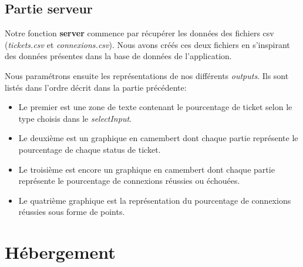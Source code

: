 \documentclass[12pt, a4paper]{article}
\begin{document}
\subsection*{Partie serveur}

Notre fonction \textbf{server} commence par récupérer les données des fichiers csv (\textit{tickets.csv} et \textit{connexions.csv}).
Nous avons créés ces deux fichiers en s'inspirant des données présentes dans la base de données de l'application.

\noindent Nous paramétrons ensuite les représentations de nos différents \textit{outputs}.
Ils sont listés dans l'ordre décrit dans la partie précédente:

\begin{itemize}
    \item Le premier est une zone de texte contenant le pourcentage de ticket selon le type choisis dans le \textit{selectInput}.
    \item Le deuxième est un graphique en camembert dont chaque partie représente le pourcentage de chaque status de ticket.
    \item Le troisième est encore un graphique en camembert dont chaque partie représente le pourcentage de connexions réussies ou échouées.
    \item Le quatrième graphique est la représentation du pourcentage de connexions réussies sous forme de points.
\end{itemize}

\section{Hébergement}
\end{document}
